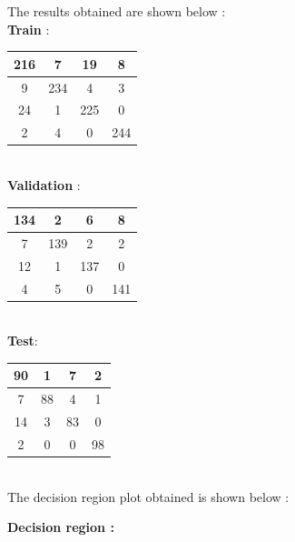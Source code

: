 \documentclass{article}
\begin{document}
\begin{flushleft}

The results obtained are shown below : \\[10pt]

\textbf{Train} : \\[10pt]
\begin{tabular}{|c|c|c|c|} \hline 216 & 7 & 19 & 8\\ \hline 9 & 234 & 4 & 3\\ \hline 24 & 1 & 225 & 0\\ \hline 2 & 4 & 0 & 244 \\ \hline \end{tabular} \\[10pt]


\textbf{Validation} : \\[10pt]

\begin{tabular}{|c|c|c|c|} \hline 134 & 2 & 6 & 8\\ \hline 7 & 139 & 2 & 2\\ \hline 12 & 1 & 137 & 0\\ \hline  4 & 5 & 0 & 141 \\ \hline \end{tabular} \\[10pt]




\textbf{Test}: \\[10pt]


\begin{tabular}{|c|c|c|c|} \hline 90 & 1 & 7 & 2\\ \hline 7 & 88 & 4 & 1\\ \hline 14 & 3 & 83 & 0\\ \hline 2 & 0 & 0 & 98  \\ \hline \end{tabular} \\[10pt]



The decision region plot obtained is shown below :

\end{flushleft}

\textbf{Decision region : \\[5pt]}
\end{document}
